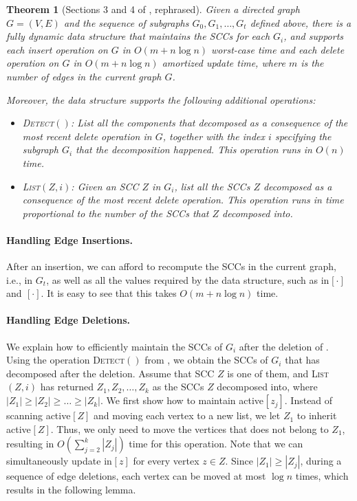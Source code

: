 \documentclass[11pt]{article}
\newtheorem{theorem}{Theorem}[section]
\renewcommand{\textsc}[1]{\textnormal{\scshape #1}}
\newcommand{\activee}[2]{\textrm{\normalfont active\( ^{  } [ #1 ] \)}\xspace} \newcommand{\inn}[2]{\textrm{\normalfont in\( ^{ } [ #1 ] \)}\xspace}
\newcommand{\outt}[2]{\textrm{\normalfont{ out}\( _{#2} [ #1 ] \)}\xspace}
\begin{document}
\begin{theorem}[Sections 3 and 4 of \cite{Roditty:2016aa}, rephrased] \label{th:roditty_SCC}
Given a directed graph \( G=(V, E) \) and the sequence  of subgraphs \( G_0, G_1, \dots, G_t \) defined above, there is a fully dynamic data structure that maintains the SCCs for each \( G_i \), and supports each insert operation on \( G \) in $O(m + n \log n)$ worst-case time and each delete operation on \( G \) in $O(m + n \log n)$ amortized update time,
where \( m \) is the number of edges in the current graph \( G \).

Moreover, the data structure supports the following additional operations:
\begin{itemize}
\item 
\textsc{Detect\( () \):} List all the components that decomposed as a consequence of the most recent delete operation in \( G \), together with the index \( i \) specifying the subgraph \( G_i \) that the decomposition happened.
This operation runs in \( O(n) \) time.

\item 
\textsc{List\( (Z, i) \):} Given an SCC \( Z \) in \( G_i \), list all the SCCs \( Z \) decomposed as a consequence of the most recent delete operation.
This operation runs in time proportional to the number of the SCCs that \( Z \) decomposed into.


\end{itemize}
\end{theorem}



\paragraph*{Handling Edge Insertions.}
After an insertion, we can afford to recompute the SCCs in the current graph, i.e., in \( G_t \), as well as all the values required by the data structure, such as \inn{\cdot}{r} and \outt{\cdot}{}.
It is easy to see that this takes \( O(m + n \log n ) \) time.

\paragraph*{Handling Edge Deletions.}
We explain how to efficiently maintain the SCCs of \( G_i \) after the deletion of \Ed.
Using the operation \textsc{Detect\( () \)} from , we obtain the SCCs of \( G_i \) that has decomposed after the deletion.
Assume that SCC \( Z \) is one of them, and \textsc{List\( (Z, i) \)} has returned \( Z_1, Z_2, \dots, Z_k \) as the SCCs \( Z \) decomposed into, where \( |Z_1| \geq |Z_2| \geq \dots \geq |Z_k| \).
We first show how to maintain \activee{z_j}{r}.
Instead of scanning \activee{Z}{r} and moving each vertex to a new list, we let \( Z_1 \) to inherit \activee{Z}{r}.
Thus, we only need to move the vertices that does not belong to \( Z_1 \), resulting in \( O(\sum _{j = 2} ^ k |Z_j| ) \) time for this operation.
Note that we can simultaneously update \inn{z}{r} for every vertex \( z \in Z \).
Since \( |Z_1| \geq |Z_j| \), during a sequence of edge deletions, each vertex can be moved at most \( \log n \) times, which results in the following lemma.
\end{document}
